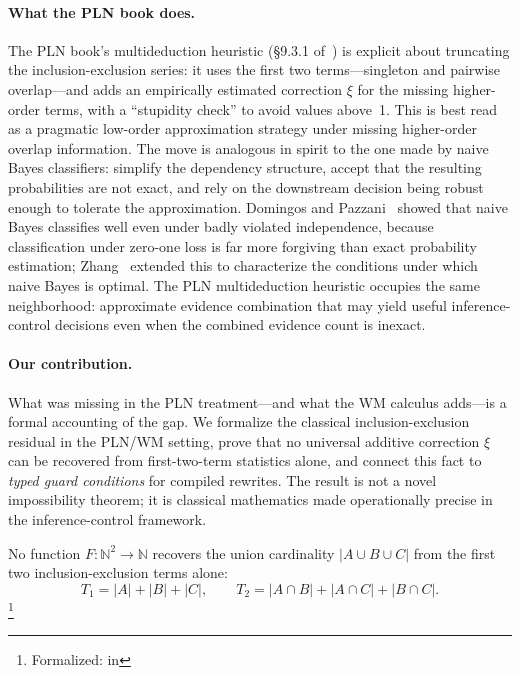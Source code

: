 \documentclass[11pt,openany]{report}
\begin{document}
\paragraph{What the PLN book does.}
The PLN book's multideduction heuristic (\S9.3.1
of~\cite{goertzel2009pln}) is explicit about truncating the
inclusion-exclusion series: it uses the first two terms---singleton
and pairwise overlap---and adds an empirically estimated correction
$\xi$ for the missing higher-order terms, with a ``stupidity check''
to avoid values above~1.  This is best read as a pragmatic low-order approximation
strategy under missing higher-order overlap information.
The move is analogous in spirit to
the one made by naive Bayes classifiers: simplify the dependency
structure, accept that the resulting probabilities are not exact, and
rely on the downstream decision being robust enough to tolerate the
approximation.  Domingos and Pazzani~\cite{DomingosPazzani1997}
showed that naive Bayes classifies well even under badly violated
independence, because classification under zero-one loss is far more
forgiving than exact probability estimation; Zhang~\cite{Zhang2004NaiveBayes}
extended this to characterize the conditions under which naive Bayes
is optimal.  The PLN multideduction heuristic occupies the same
neighborhood: approximate evidence combination that may yield useful
inference-control decisions even when the combined evidence count is
inexact.

\paragraph{Our contribution.}
What was missing in the PLN treatment---and what the WM calculus
adds---is a formal accounting of the gap.  We formalize the classical
inclusion-exclusion residual in the PLN/WM setting, prove that no
universal additive correction $\xi$ can be recovered from
first-two-term statistics alone, and connect this fact to
\emph{typed guard conditions} for compiled rewrites.  The result is
not a novel impossibility theorem; it is classical mathematics made
operationally precise in the inference-control framework.

\begin{theorem}
\label{thm:ie-no-go}
No function $F : \mathbb{N}^2 \to \mathbb{N}$ recovers the union
cardinality $|A \cup B \cup C|$ from the first two
inclusion-exclusion terms alone:
\[
  T_1 = |A| + |B| + |C|, \qquad
  T_2 = |A \cap B| + |A \cap C| + |B \cap C|.
\]%
\footnote{Formalized:
in 
}
\end{theorem}
\end{document}
